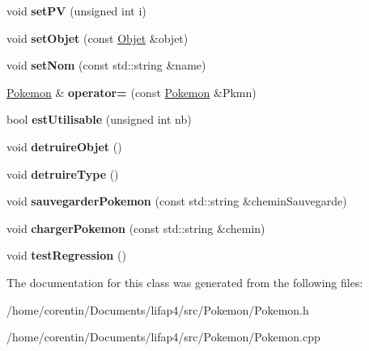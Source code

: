 \begin{DoxyCompactItemize}
\mbox{\label{class_pokemon_a2cc7213be7abb087f4b55b2a55816e55}} 
void {\bfseries set\+PV} (unsigned int i)
\item 
\mbox{\label{class_pokemon_a7ee138861b0c55abc11fd359d0a72165}} 
void {\bfseries set\+Objet} (const \hyperlink{class_objet}{Objet} \&objet)
\item 
\mbox{\label{class_pokemon_af8bb49fc8e2afaec5cdfdb764d0a2485}} 
void {\bfseries set\+Nom} (const std\+::string \&name)
\item 
\mbox{\label{class_pokemon_aa991f8c70046ffb8739bba5f09a6dd79}} 
\hyperlink{class_pokemon}{Pokemon} \& {\bfseries operator=} (const \hyperlink{class_pokemon}{Pokemon} \&Pkmn)
\item 
\mbox{\label{class_pokemon_a47c6623448a63b5553b741dbb07dfd90}} 
bool {\bfseries est\+Utilisable} (unsigned int nb)
\item 
\mbox{\label{class_pokemon_a4b54e07c0109e6f606f256b046d5ccfb}} 
void {\bfseries detruire\+Objet} ()
\item 
\mbox{\label{class_pokemon_a2167050710f546d4a4408b443cd16f8d}} 
void {\bfseries detruire\+Type} ()
\item 
\mbox{\label{class_pokemon_a237e8ab983252ca05931fcd30c8adbc2}} 
void {\bfseries sauvegarder\+Pokemon} (const std\+::string \&chemin\+Sauvegarde)
\item 
\mbox{\label{class_pokemon_a26771eddf70badfce2fe1aeaf2d89b81}} 
void {\bfseries charger\+Pokemon} (const std\+::string \&chemin)
\item 
\mbox{\label{class_pokemon_a1702b9d4b17a506f4f14a1f0ac142553}} 
void {\bfseries test\+Regression} ()
\end{DoxyCompactItemize}


The documentation for this class was generated from the following files\+:\begin{DoxyCompactItemize}
\item 
/home/corentin/\+Documents/lifap4/src/\+Pokemon/Pokemon.\+h\item 
/home/corentin/\+Documents/lifap4/src/\+Pokemon/Pokemon.\+cpp\end{DoxyCompactItemize}
